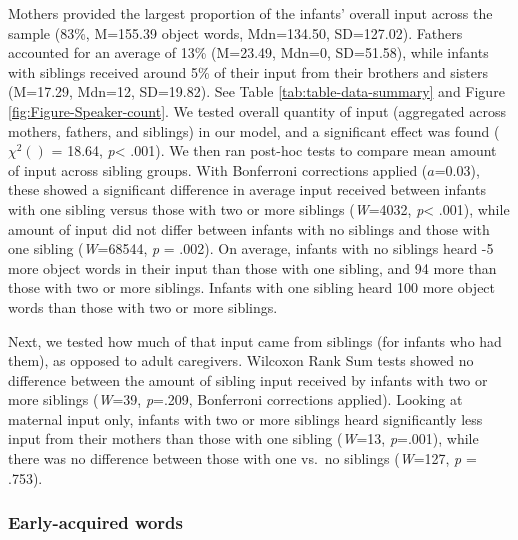 \documentclass[
  english,
  man,floatsintext]{apa6}
\begin{document}
Mothers provided the largest proportion of the infants' overall input across the sample (83\%, M=155.39 object words, Mdn=134.50, SD=127.02). Fathers accounted for an average of 13\% (M=23.49, Mdn=0, SD=51.58), while infants with siblings received around 5\% of their input from their brothers and sisters (M=17.29, Mdn=12, SD=19.82). See Table \ref{tab:table-data-summary} and Figure \ref{fig:Figure-Speaker-count}. We tested overall quantity of input (aggregated across mothers, fathers, and siblings) in our model, and a significant effect was found (\(\chi^2 ()\) = 18.64, \emph{p}\textless{} .001). We then ran post-hoc tests to compare mean amount of input across sibling groups. With Bonferroni corrections applied (\(a\)=0.03), these showed a significant difference in average input received between infants with one sibling versus those with two or more siblings (\emph{W}=4032, \emph{p}\textless{} .001), while amount of input did not differ between infants with no siblings and those with one sibling (\emph{W}=68544, \emph{p} = .002). On average, infants with no siblings heard -5 more object words in their input than those with one sibling, and 94 more than those with two or more siblings. Infants with one sibling heard 100 more object words than those with two or more siblings.

Next, we tested how much of that input came from siblings (for infants who had them), as opposed to adult caregivers. Wilcoxon Rank Sum tests showed no difference between the amount of sibling input received by infants with two or more siblings (\emph{W}=39, \emph{p}=.209, Bonferroni corrections applied). Looking at maternal input only, infants with two or more siblings heard significantly less input from their mothers than those with one sibling (\emph{W}=13, \emph{p}=.001), while there was no difference between those with one vs.~no siblings (\emph{W}=127, \emph{p} = .753).

\hypertarget{early-acquired-words}{%
\subsubsection{Early-acquired words}\label{early-acquired-words}}
\end{document}
